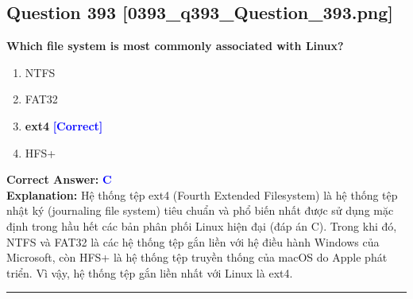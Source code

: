 \documentclass[11pt,a4paper]{article}
\begin{document}
\begin{minipage}{\textwidth}
\subsection*{Question 393 \quad \footnotesize{[0393\_q393\_Question\_393.png]}}
\noindent \textbf{Which file system is most commonly associated with Linux?}

\begin{enumerate}[label=\Alph*.]
    \item NTFS
    \item FAT32
    \item \textbf{ext4} \hfill \textcolor{blue}{\textbf{[Correct]}}
    \item HFS+
\end{enumerate}

\noindent \textbf{Correct Answer:} \textcolor{blue}{\textbf{C}} \\[2pt]
\noindent \textbf{Explanation:} Hệ thống tệp ext4 (Fourth Extended Filesystem) là hệ thống tệp nhật ký (journaling file system) tiêu chuẩn và phổ biến nhất được sử dụng mặc định trong hầu hết các bản phân phối Linux hiện đại (đáp án C). Trong khi đó, NTFS và FAT32 là các hệ thống tệp gắn liền với hệ điều hành Windows của Microsoft, còn HFS+ là hệ thống tệp truyền thống của macOS do Apple phát triển. Vì vậy, hệ thống tệp gắn liền nhất với Linux là ext4.

\par\vspace{0.3cm}
\hrule
\vspace{0.3cm}
\end{minipage}
\end{document}
